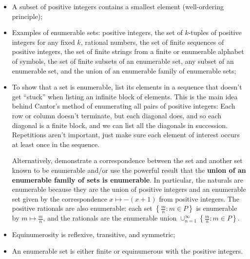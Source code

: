\begin{summary}
  \begin{itemize}
    \item A subset of positive integers contains a smallest element (well-ordering principle);
    \item Examples of enumerable sets: positive integers, the set of $k$-tuples of positive integers for any fixed $k$, rational numbers, the set of finite sequences of positive integers, the set of finite strings from a finite or enumerable alphabet of symbols, the set of finite subsets of an enumerable set, any subset of an enumerable set, and the union of an enumerable family of enumerable sets;
    \item To show that a set is enumerable, list its elements in a sequence that doesn't get ``stuck'' when listing an infinite block of elements.
    This is the main idea behind Cantor's method of enumerating all pairs of positive integers: Each row or column doesn't terminate, but each diagonal does, and so each diagonal is a finite block, and we can list all the diagonals in succession.
    Repetitions aren't important, just make sure each element of interest occurs at least once in the sequence.

    Alternatively, demonstrate a correspondence between the set and another set known to be enumerable and/or use the powerful result that the \textbf{union of an enumerable family of sets is enumerable}.
    In particular, the naturals are enumerable because they are the union of positive integers and an enumerable set given by the correspondence $x \mapsto -(x+1)$ from positive integers.
    The positive rationals are also enumerable: each set $\left\{\frac{m}{n} : m \in P\right\}$ is enumerable by $m \mapsto \frac{m}{n}$, and the rationals are the enumerable union $\cup_{n=1}^\infty \left\{\frac{m}{n} : m \in P\right\}$.

    \item Equinumerosity is reflexive, transitive, and symmetric;
    \item An enumerable set is either finite or equinumerous with the positive integers.
  \end{itemize}
\end{summary}
